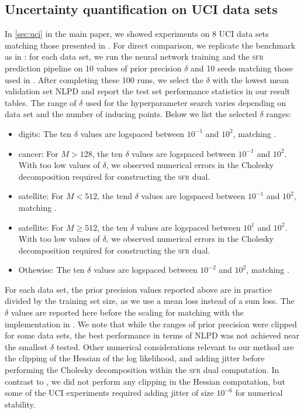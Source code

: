 \documentclass{article}
\newcommand{\our}{\textsc{sfr}\xspace}
\begin{document}
\subsection{Uncertainty quantification on UCI data sets}
\label{app:uci}
%
In \cref{sec:uci} in the main paper, we showed experiments on 8 UCI data sets \cite{UCI} matching those presented in \cite{immer2021improving}. For direct comparison, we replicate the benchmark as in \cite{immer2021improving}: for each data set, we run the neural network training and the \our prediction pipeline on 10 values of prior precision $\delta$ and 10 seeds matching those used in \cite{immer2021improving}. After completing these 100 runs, we select the $\delta$ with the lowest mean validation set NLPD and report the test set performance statistics in our result tables. The range of $\delta$ used for the hyperparameter search varies depending on data set and the number of inducing points. Below we list the selected $\delta$ ranges:
\begin{itemize}
\item {\sc digits}: The ten $\delta$ values are logspaced between $10^{-1}$ and $10^2$, matching \cite{immer2021improving}.
\item {\sc cancer}: For $M > 128$, the ten $\delta$ values are logspaced between $10^{-1}$ and $10^2$. With too low values of $\delta$, we observed numerical errors in the Cholesky decomposition required for constructing the \our dual.
\item {\sc satellite}: For $M < 512$, the tend $\delta$ values are logspaced between $10^{-1}$ and $10^2$, matching \cite{immer2021improving}.
\item {\sc satellite}: For $M \geq 512$, the ten $\delta$ values are logspaced between $10^{1}$ and $10^2$.  With too low values of $\delta$, we observed numerical errors in the Cholesky decomposition required for constructing the \our dual.
\item Othewise: The ten $\delta$ values are logspaced between $10^{-2}$ and $10^2$, matching \cite{immer2021improving}.
\end{itemize}

For each data set, the prior precision values reported above are in practice divided by the training set size, as we use a mean loss instead of a sum loss. The $\delta$ values are reported here before the scaling for matching with the implementation in \cite{immer2021improving}.
We note that while the ranges of prior precision were clipped for some data sets, the best performance in terms of NLPD was not achieved near the smallest $\delta$ tested. Other numerical considerations relevant to our method are the clipping of the Hessian of the log likelihood, and adding jitter before performing the Cholesky decomposition within the \our dual computation. In contrast to \citet{immer2021improving}, we did not perform any clipping in the Hessian computation, but some of the UCI experiments required adding jitter of size $10^{-6}$ for numerical stability.  
\end{document}
